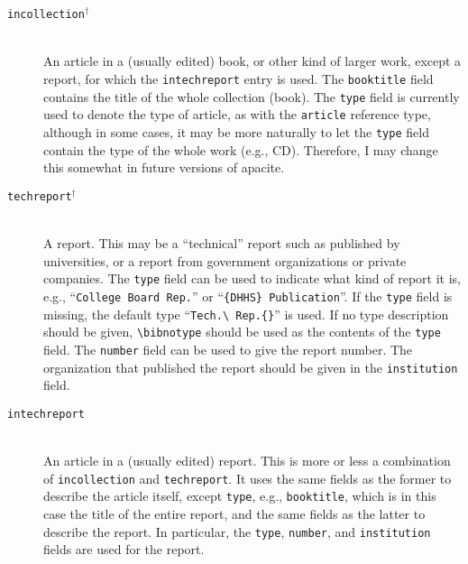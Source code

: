 \documentclass{article}
\newcommand{\LC}{\mbox{${}^{\dag}$}}%
\newcommand{\pkg}[1]{\textsf{#1}}%
\newcommand{\fieldname}[1]{\texttt{#1}}%
\newcommand{\entryname}[1]{\texttt{#1}}%
\begin{document}
\begin{description}
    \item[\entryname{incollection}\LC] \mbox{}\\
        An article in a (usually edited) book, or other kind of larger
        work, except a report, for which the \entryname{intechreport}
        entry is used. The \fieldname{booktitle} field contains the
        title of the whole collection (book). The \fieldname{type}
        field is currently used to denote the type of article, as
        with the \entryname{article} reference type, although in some
        cases, it may be more naturally to let the \fieldname{type}
        field contain the type of the whole work (e.g., CD). Therefore,
        I may change this somewhat in future versions of \pkg{apacite}.

    \item[\entryname{techreport}\LC] \mbox{}\\
        A report. This may be a ``technical'' report such as published
        by universities, or a report from government organizations or
        private companies. The \fieldname{type} field can be used to
        indicate what kind of report it is, e.g.,
        ``\verb+College Board Rep.+'' or ``\verb+{DHHS} Publication+''.
        If the \fieldname{type} field is missing, the default type
        ``\verb+Tech.\ Rep.{}+'' is used. If no type description should
        be given, \verb+\bibnotype+ should be used as the contents of
        the \fieldname{type} field. The \fieldname{number} field can
        be used to give the report number. The organization that
        published the report should be given in the \fieldname{institution}
        field.

    \item[\entryname{intechreport}] \mbox{}\\
        An article in a (usually edited) report. This is more or less
        a combination of \entryname{incollection} and
        \entryname{techreport}. It uses the same fields as the former
        to describe the article itself, except \fieldname{type}, e.g.,
        \fieldname{booktitle}, which is in this case the title of the
        entire report,
        and the same fields as the latter to describe the report.
        In particular, the \fieldname{type}, \fieldname{number},
        and \fieldname{institution} fields are used for the report.


\end{description}
\end{document}
